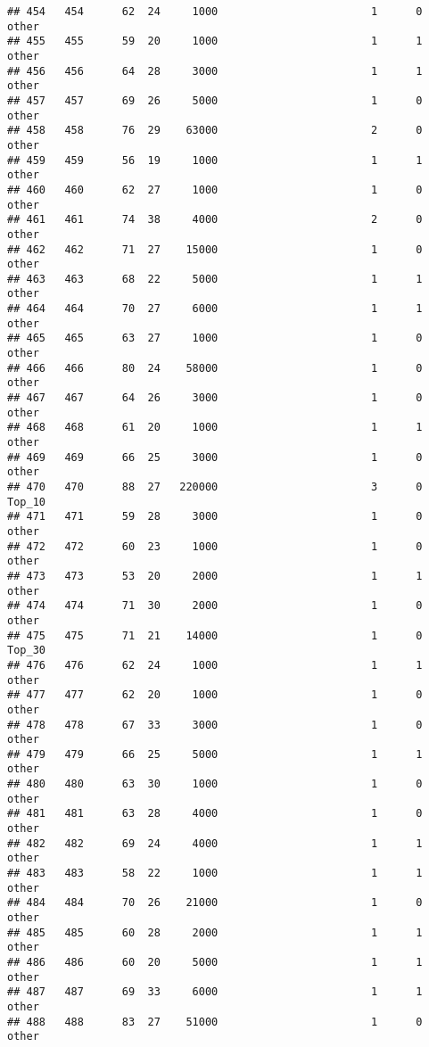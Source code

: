 \documentclass[
]{article}
\begin{document}
\begin{verbatim}
## 454   454      62  24     1000                        1      0    other
## 455   455      59  20     1000                        1      1    other
## 456   456      64  28     3000                        1      1    other
## 457   457      69  26     5000                        1      0    other
## 458   458      76  29    63000                        2      0    other
## 459   459      56  19     1000                        1      1    other
## 460   460      62  27     1000                        1      0    other
## 461   461      74  38     4000                        2      0    other
## 462   462      71  27    15000                        1      0    other
## 463   463      68  22     5000                        1      1    other
## 464   464      70  27     6000                        1      1    other
## 465   465      63  27     1000                        1      0    other
## 466   466      80  24    58000                        1      0    other
## 467   467      64  26     3000                        1      0    other
## 468   468      61  20     1000                        1      1    other
## 469   469      66  25     3000                        1      0    other
## 470   470      88  27   220000                        3      0   Top_10
## 471   471      59  28     3000                        1      0    other
## 472   472      60  23     1000                        1      0    other
## 473   473      53  20     2000                        1      1    other
## 474   474      71  30     2000                        1      0    other
## 475   475      71  21    14000                        1      0   Top_30
## 476   476      62  24     1000                        1      1    other
## 477   477      62  20     1000                        1      0    other
## 478   478      67  33     3000                        1      0    other
## 479   479      66  25     5000                        1      1    other
## 480   480      63  30     1000                        1      0    other
## 481   481      63  28     4000                        1      0    other
## 482   482      69  24     4000                        1      1    other
## 483   483      58  22     1000                        1      1    other
## 484   484      70  26    21000                        1      0    other
## 485   485      60  28     2000                        1      1    other
## 486   486      60  20     5000                        1      1    other
## 487   487      69  33     6000                        1      1    other
## 488   488      83  27    51000                        1      0    other

\end{verbatim}
\end{document}
